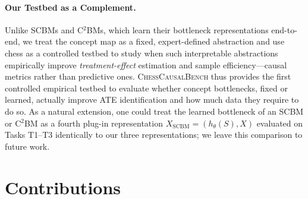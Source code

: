 \documentclass{article}
\begin{document}
\paragraph{Our Testbed as a Complement.}
Unlike SCBMs and C$^2$BMs, which learn their bottleneck representations end-to-end,
we treat the concept map as a fixed, expert-defined abstraction and use chess as a
controlled testbed to study when such interpretable abstractions empirically improve
\emph{treatment-effect} estimation and sample efficiency---causal metrics rather
than predictive ones.\cite{fromCausalToConcept,scholkopf2021towards}
\textsc{ChessCausalBench} thus provides the first controlled empirical testbed to
evaluate whether concept bottlenecks, fixed or learned, actually improve ATE
identification and how much data they require to do so. As a natural extension, one
could treat the learned bottleneck of an SCBM or C$^2$BM as a fourth plug-in
representation $X_{\text{SCBM}} = (h_\theta(S), X)$ evaluated on Tasks T1--T3
identically to our three representations; we leave this comparison to future work.

\section{Contributions}
\end{document}
